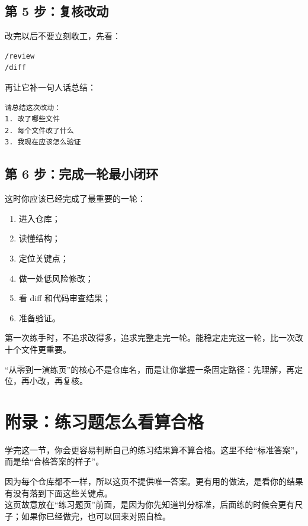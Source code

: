 \documentclass[UTF8,a4paper,12pt]{ctexart}
\begin{document}
\subsection{第 5 步：复核改动}

改完以后不要立刻收工，先看：

\begin{lstlisting}[style=cli]
/review
/diff
\end{lstlisting}

再让它补一句人话总结：

\begin{lstlisting}[style=prompt]
请总结这次改动：
1. 改了哪些文件
2. 每个文件改了什么
3. 我现在应该怎么验证
\end{lstlisting}

\subsection{第 6 步：完成一轮最小闭环}

这时你应该已经完成了最重要的一轮：
\begin{enumerate}
  \item 进入仓库；
  \item 读懂结构；
  \item 定位关键点；
  \item 做一处低风险修改；
  \item 看 diff 和代码审查结果；
  \item 准备验证。
\end{enumerate}

\begin{tipbox}
第一次练手时，不追求改得多，追求完整走完一轮。能稳定走完这一轮，比一次改十个文件更重要。
\end{tipbox}

\begin{sumbox}
“从零到一演练页”的核心不是仓库名，而是让你掌握一条固定路径：先理解，再定位，再小改，再复核。
\end{sumbox}

\section{附录：练习题怎么看算合格}

\begin{learnbox}
学完这一节，你会更容易判断自己的练习结果算不算合格。这里不给“标准答案”，而是给“合格答案的样子”。
\end{learnbox}

因为每个仓库都不一样，所以这页不提供唯一答案。更有用的做法，是看你的结果有没有落到下面这些关键点。\\
这页故意放在“练习题页”前面，是因为你先知道判分标准，后面练的时候会更有尺子；如果你已经做完，也可以回来对照自检。
\end{document}
